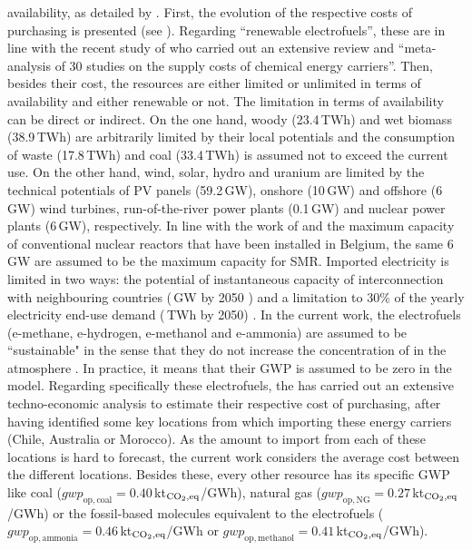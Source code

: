 availability, as detailed by \citet{limpens2024pathway}. First, the evolution of the respective costs of purchasing is presented (see ). Regarding ``renewable electrofuels'', these are in line with the recent study of \citet{genge2023supply} who carried out an extensive review and ``meta-analysis\cite{grant2009typology,page2021prisma} of 30 studies on the supply costs of chemical energy carriers''. Then, besides their cost, the resources are either limited or unlimited in terms of availability and either renewable or not. The limitation in terms of availability can be direct or indirect. On the one hand, woody (23.4\,TWh) and wet biomass (38.9\,TWh) are arbitrarily limited by their local potentials and the consumption of waste (17.8\,TWh) and coal (33.4\,TWh) is assumed not to exceed the current use. On the other hand, wind, solar, hydro and uranium are limited by the technical potentials of \gls{PV} panels (59.2\,GW), onshore (10\,GW) and offshore (6\,GW) wind turbines, run-of-the-river power plants (0.1\,GW) and nuclear power plants (6\,GW), respectively. In line with the work of \citet{PATHS2050} and the maximum capacity of conventional nuclear reactors that have been installed in Belgium, the same 6\,GW are assumed to be the maximum capacity for \gls{SMR}. Imported electricity is limited in two ways: the potential of instantaneous capacity of interconnection with neighbouring countries (\,GW by 2050 \cite{ELIA_2050}) and a limitation to 30\% of the yearly electricity end-use demand (\,TWh by 2050) \cite{limpens2021generating}. In the current work, the electrofuels (\ie e-methane, e-hydrogen, e-methanol and e-ammonia) are assumed to be ``sustainable" in the sense that they do not increase the concentration of  in the atmosphere \cite{rixhon2021terminology}. In practice, it means that their \gls{GWP} is assumed to be zero in the model. Regarding specifically these electrofuels, the \citet{h2coalition} has carried out an extensive techno-economic analysis to estimate their respective cost of purchasing, after having identified some key locations from which importing these energy carriers (\eg Chile, Australia or Morocco). As the amount to import from each of these locations is hard to forecast, the current work considers the average cost between the different locations. Besides these, every other resource has its specific \gls{GWP} like coal ($\mathit{gwp}_{\mathrm{op,coal}}=0.40$\,kt$_{\ce{CO2},\text{eq}}$/GWh), natural gas ($\mathit{gwp}_{\mathrm{op,NG}}=0.27$\,kt$_{\ce{CO2},\text{eq}}$/GWh) or the fossil-based molecules equivalent to the electrofuels (\eg $\mathit{gwp}_{\mathrm{op,ammonia}}=0.46$\,kt$_{\ce{CO2},\text{eq}}$/GWh or $\mathit{gwp}_{\mathrm{op,methanol}}=0.41$\,kt$_{\ce{CO2},\text{eq}}$/GWh).

